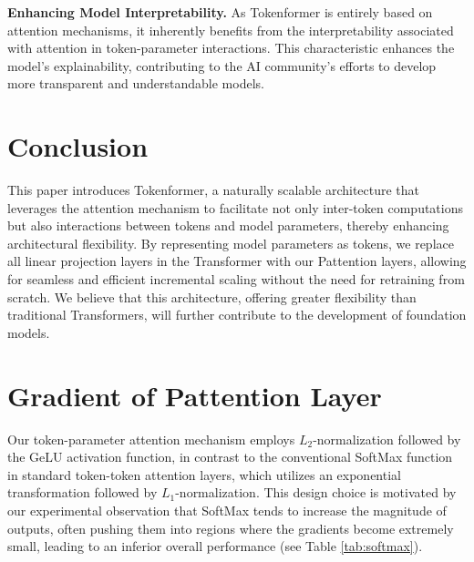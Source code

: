 \documentclass{article} %
\newcommand{\ourmethod}{Tokenformer\xspace}
\begin{document}
\textbf{Enhancing Model Interpretability.} As \ourmethod is entirely based on attention mechanisms, it inherently benefits from the interpretability associated with attention in token-parameter interactions. This characteristic enhances the model's explainability, contributing to the AI community's efforts to develop more transparent and understandable models.

\section{Conclusion}
This paper introduces \ourmethod, a naturally scalable architecture that leverages the attention mechanism to facilitate not only inter-token computations but also interactions between tokens and model parameters, thereby enhancing architectural flexibility. By representing model parameters as tokens, we replace all linear projection layers in the Transformer with our Pattention layers, allowing for seamless and efficient incremental scaling without the need for retraining from scratch. We believe that this architecture, offering greater flexibility than traditional Transformers, will further contribute to the development of foundation models.




\newpage
\appendix
\section{Gradient of Pattention Layer} \label{appedix:grad}
Our token-parameter attention mechanism employs $L_2$-normalization followed by the GeLU \citep{hendrycks2016gaussian} activation function, in contrast to the conventional SoftMax function in standard token-token attention layers, which utilizes an exponential transformation followed by $L_1$-normalization. 
This design choice is motivated by our experimental observation that SoftMax tends to increase the magnitude of outputs, often pushing them into regions where the gradients become extremely small, leading to an inferior overall performance (see Table \ref{tab:softmax}).
\end{document}
